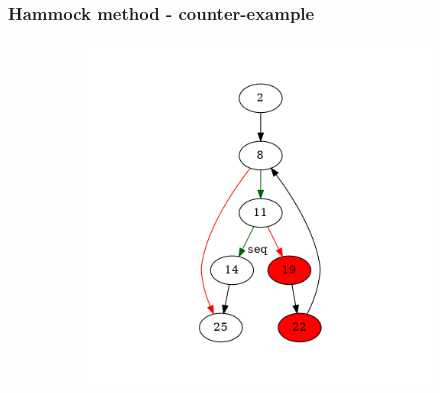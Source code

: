 \documentclass[aspectratio=1610]{beamer}
\begin{document}
\begin{frame}
	\frametitle{Hammock method - counter-example}
	\begin{figure}[htbp]
		\centering
		\begin{subfigure}[b]{0.50\textwidth}
			\centering
			\includegraphics[height=0.6\paperheight]{inc/methods/hammock/counter-example/with-break/main_0001a.png}
		\end{subfigure}
	\end{figure}
\end{frame}
\end{document}
